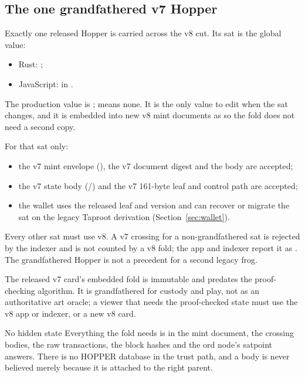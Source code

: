 \subsection{The one grandfathered v7 Hopper}\label{sec:grandfather}

Exactly one released Hopper is carried across the v8 cut. Its sat is the
global  value:
\begin{itemize}[leftmargin=1.4em,itemsep=0.2em]
  \item Rust: ;
  \item JavaScript:  in
        .
\end{itemize}
The production value is ;  means none.
It is the only value to edit when the sat changes, and it is embedded into
new v8 mint documents as  so the fold does not need a
second copy.

For that sat only:
\begin{itemize}[leftmargin=1.4em,itemsep=0.2em]
  \item the v7 mint envelope (), the v7 document digest and the
         body are accepted;
  \item the v7 state body (/) and the v7
        161-byte leaf and control path are accepted;
  \item the wallet uses the released leaf and version and can recover or
        migrate the sat on the legacy Taproot derivation
        (Section~\ref{sec:wallet}).
\end{itemize}
Every other sat must use v8. A v7 crossing for a non-grandfathered sat is
rejected by the indexer and is not counted by a v8 fold; the app and indexer
report it as . The grandfathered Hopper is not a precedent
for a second legacy frog.

The released v7 card's embedded fold is immutable and predates the
proof-checking algorithm. It is grandfathered for custody and play, not as an
authoritative art oracle; a viewer that needs the proof-checked state must
use the v8 app or indexer, or a new v8 card.

\begin{invariant}{No hidden state}
Everything the fold needs is in the mint document, the crossing bodies, the
raw transactions, the block hashes and the ord node's satpoint answers. There
is no HOPPER database in the trust path, and a body is never believed merely
because it is attached to the right parent.
\end{invariant}

